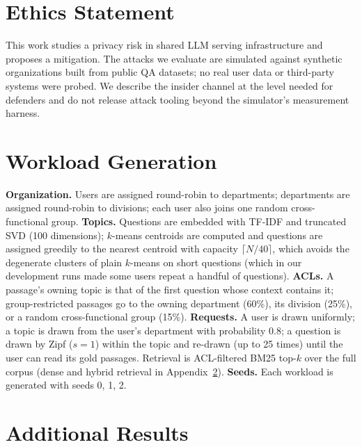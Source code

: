 \documentclass[11pt]{article}
\begin{document}
\section*{Ethics Statement}
This work studies a privacy risk in shared LLM serving infrastructure and proposes a mitigation. The attacks we evaluate are simulated against synthetic organizations built from public QA datasets; no real user data or third-party systems were probed. We describe the insider channel at the level needed for defenders and do not release attack tooling beyond the simulator's measurement harness.



\appendix

\section{Workload Generation}
\label{app:workloads}
\textbf{Organization.} Users are assigned round-robin to departments; departments are assigned round-robin to divisions; each user also joins one random cross-functional group. \textbf{Topics.} Questions are embedded with TF-IDF and truncated SVD (100 dimensions); $k$-means centroids are computed and questions are assigned greedily to the nearest centroid with capacity $\lceil N/40\rceil$, which avoids the degenerate clusters of plain $k$-means on short questions (which in our development runs made some users repeat a handful of questions). \textbf{ACLs.} A passage's owning topic is that of the first question whose context contains it; group-restricted passages go to the owning department (60\%), its division (25\%), or a random cross-functional group (15\%). \textbf{Requests.} A user is drawn uniformly; a topic is drawn from the user's department with probability 0.8; a question is drawn by Zipf ($s{=}1$) within the topic and re-drawn (up to 25 times) until the user can read its gold passages. Retrieval is ACL-filtered BM25 top-$k$ over the full corpus (dense and hybrid retrieval in Appendix~\ref{app:extra}). \textbf{Seeds.} Each workload is generated with seeds 0, 1, 2.

\section{Additional Results}
\label{app:extra}

\begin{table}[h]
\centering
\small
\setlength{\tabcolsep}{3pt}
\resizebox{\columnwidth}{!}{}
\caption{Cached prompt tokens (\%) on HotpotQA (seed 0) under scaling variants; 2\,GiB unless stated.}
\label{tab:scaling}
\end{table}
\end{document}
